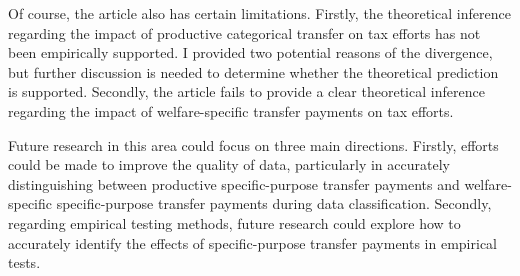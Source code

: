Of course, the article also has certain limitations. Firstly, the theoretical inference regarding the impact of productive categorical transfer on tax efforts has not been empirically supported. I provided two potential reasons of the divergence, but further discussion is needed to determine whether the theoretical prediction is supported. Secondly, the article fails to provide a clear theoretical inference regarding the impact of welfare-specific transfer payments on tax efforts.

Future research in this area could focus on three main directions. Firstly, efforts could be made to improve the quality of data, particularly in accurately distinguishing between productive specific-purpose transfer payments and welfare-specific specific-purpose transfer payments during data classification. Secondly, regarding empirical testing methods, future research could explore how to accurately identify the effects of specific-purpose transfer payments in empirical tests.





